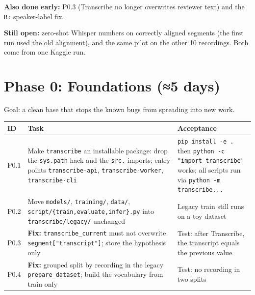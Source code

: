 \documentclass[11pt]{article}
\begin{document}
\textbf{Also done early:} P0.3 (Transcribe no longer overwrites reviewer text) and the \texttt{R:} speaker-label fix.

\textbf{Still open:} zero-shot Whisper numbers on correctly aligned segments (the first run used the old alignment), and the same pilot on the other 10 recordings. Both come from one Kaggle run.

\hypertarget{phase-0-foundations-5-days}{%
\section{Phase 0: Foundations (≈5 days)}\label{phase-0-foundations-5-days}}

Goal: a clean base that stops the known bugs from spreading into new work.

\begin{longtable}[]{@{}>{\raggedright\arraybackslash}p{}>{\raggedright\arraybackslash}p{}>{\raggedright\arraybackslash}p{}@{}}
\toprule\noalign{}
ID & Task & Acceptance \\
\midrule\noalign{}
\endhead
\bottomrule\noalign{}
\endlastfoot
P0.1 & Make \texttt{transcribe} an installable package: drop the \texttt{sys.\allowbreak{}path} hack and the \texttt{src.\allowbreak{}} imports; entry points \texttt{transcribe-\allowbreak{}api}, \texttt{transcribe-\allowbreak{}worker}, \texttt{transcribe-\allowbreak{}cli} & \texttt{pip install -\allowbreak{}e .\allowbreak{}} then \texttt{python -\allowbreak{}c "import transcribe"} works; all scripts run via \texttt{python -\allowbreak{}m transcribe.\allowbreak{}.\allowbreak{}.\allowbreak{}} \\
P0.2 & Move \texttt{models/\allowbreak{}}, \texttt{training/\allowbreak{}}, \texttt{data/\allowbreak{}}, \texttt{script/\allowbreak{}\{train,\allowbreak{}evaluate,\allowbreak{}infer\}.\allowbreak{}py} into \texttt{transcribe/\allowbreak{}legacy/\allowbreak{}} unchanged & Legacy train still runs on a toy dataset \\
P0.3 & \textbf{Fix:} \texttt{transcribe\_\allowbreak{}current} must not overwrite \texttt{segment["transcript"]}; store the hypothesis only & Test: after Transcribe, the transcript equals the previous value \\
P0.4 & \textbf{Fix:} grouped split by recording in the legacy \texttt{prepare\_\allowbreak{}dataset}; build the vocabulary from train only & Test: no recording in two splits \\

\end{longtable}
\end{document}
